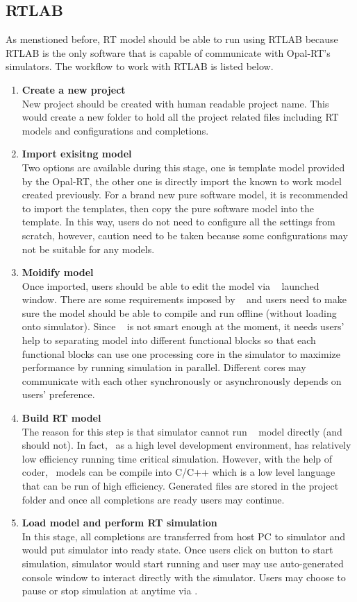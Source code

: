 \subsection{RTLAB}
As menstioned before, \gls{RT} model should be able to run using RTLAB because RTLAB is the only software that is capable of communicate with Opal-RT's simulators. The workflow to work with RTLAB is listed below. 
\begin{enumerate}
\item \textbf{Create a new project} \\
New project should be created with human readable project name. This would create a new folder to hold all the project related files including \gls{RT} models and configurations and completions. 
\item \textbf{Import exisitng model} \\
Two options are available during this stage, one is template model provided by the Opal-RT, the other one is directly import the known to work model created previously. For a brand new pure software model, it is recommended  to import the templates, then copy the pure software model into the template. In this way, users do not need to configure all the settings from scratch, however, caution need to be taken because some configurations may not be suitable for any models. 
\item \textbf{Moidify model} \\
Once imported, users should be able to edit the model via \rtlab~ launched \matlab~ window. There are some requirements imposed by \rtlab~ and users need to make sure the model should be able to compile and run offline (without loading onto simulator). Since \rtlab~ is not smart enough at the moment, it needs users' help to separating model into different functional blocks so that each functional blocks can use one processing core in the simulator to maximize performance by running simulation in parallel. Different cores may communicate with each other synchronously or asynchronously depends on users' preference. 
\item \textbf{Build \gls{RT} model} \\
The reason for this step is that simulator cannot run \matlab~ model directly (and should not). In fact, \simulink~as a high level development environment, has relatively low efficiency running time critical simulation. However, with the help of \matlab~ coder, \simulink~models can be compile into C/C++ which is a low level language that can be run of high efficiency. Generated files are stored in the project folder and once all completions are ready users may continue. 
\item \textbf{Load model and perform \gls{RT} simulation} \\
In this stage, all completions are transferred from host PC to simulator and \rtlab~ would put simulator into ready state. Once users click on button to start simulation, simulator would start running and user may use auto-generated console window to interact directly with the simulator. Users may choose to pause or stop simulation at anytime via \rtlab.
\end{enumerate}
